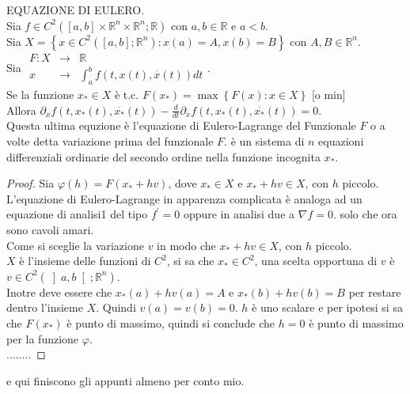 \theorem EQUAZIONE DI EULERO.\\
Sia $f\in C^2\left(\left[a,b\right]\times\mathbb{R}^n\times\mathbb{R}^n;\mathbb{R}\right)$ con $a,b\in\mathbb{R}$ e $a<b$.\\
Sia $X=\left\{x\in C^2\left(\left[a,b\right];\mathbb{R}^n\right): x(a)=A, x(b)=B\right\}$ con $A,B\in\mathbb{R}^n$.\\
Sia $\begin{array}{ccc} F: X & \to & \mathbb{R} \\
x & \to & \int_{a}^b f(t,x(t),\overset{\cdot}{x}(t))dt\end{array}$.\\
Se la funzione $x_\ast\in X$ è t.c. $F(x_\ast)=\max\left\{F(x):x\in X \right\}$ [o min]\\
Allora $\partial_xf(t,x_\ast(t),\overset{\cdot}{x_\ast}(t))-\frac{d}{dt}\partial_{\overset{\cdot}{x}}f(t,x_\ast(t),\overset{\cdot}{x_\ast}(t))=0$.\\
Questa ultima equzione è l'equazione di Eulero-Lagrange del Funzionale $F$ o a volte detta variazione prima del funzionale $F$. è un sistema di $n$ equazioni differenziali ordinarie del secondo ordine nella funzione incognita $x_\ast$.
\begin{proof}
	 Sia $\varphi(h)=F(x_\ast+hv)$, dove $x_\ast\in X$ e $x_\ast+hv\in X$, con $h$ piccolo.\\
	 L'equazione di Eulero-Lagrange in apparenza complicata è analoga ad un equazione di analisi1 del tipo $f^{'}=0$ oppure in analisi due a $\nabla f=0$. solo che ora sono cavoli amari.\\
	 Come si sceglie la variazione $v$ in modo che $x_\ast+hv\in X$, con $h$ piccolo.\\
	 $X$ è l'insieme delle funzioni di $C^2$, si sa che $x_\ast\in C^2$, una scelta opportuna di $v$ è $v\in C^2(\left]a,b\right[;\mathbb{R}^n)$.\\
	 Inotre deve essere che $ x_\ast(a)+hv(a)=A$ e  $x_\ast(b)+hv(b)=B$ per restare dentro l'insieme $X$.
	 Quindi $v(a)=v(b)=0$.
	 $h$ è uno scalare e per ipotesi si sa che $F(x_\ast)$ è punto di massimo, quindi si conclude che $h=0$ è punto di massimo per la funzione $\varphi$.\\
	 ........ 
\end{proof}
e qui finiscono gli appunti almeno per conto mio.


